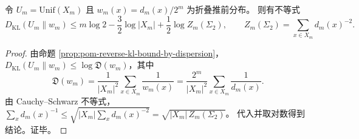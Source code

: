 \begin{corollary}[属二配分函数控制的反向 KL 上界]\label{cor:fold-reversekl-controlled-by-genus2-partition}
令 \(U_m=\mathrm{Unif}(X_m)\) 且 \(w_m(x)=d_m(x)/2^m\) 为折叠推前分布。
则有不等式
\[
D_{\mathrm{KL}}(U_m\|w_m)
\le
m\log 2-\frac{3}{2}\log|X_m|+\frac{1}{2}\log Z_m(\Sigma_2),
\qquad
Z_m(\Sigma_2)=\sum_{x\in X_m}d_m(x)^{-2}.
\]
\end{corollary}
\begin{proof}
由命题 \ref{prop:pom-reverse-kl-bound-by-dispersion}，
\(
D_{\mathrm{KL}}(U_m\|w_m)\le \log\mathfrak{D}(w_m)
\)，其中
\[
\mathfrak{D}(w_m)=\frac{1}{|X_m|^2}\sum_{x\in X_m}\frac{1}{w_m(x)}
=\frac{2^m}{|X_m|^2}\sum_{x\in X_m}\frac{1}{d_m(x)}.
\]
由 Cauchy--Schwarz 不等式，
\(
\sum_x d_m(x)^{-1}\le \sqrt{|X_m|\sum_x d_m(x)^{-2}}=\sqrt{|X_m|\,Z_m(\Sigma_2)}
\)。
代入并取对数得到结论。证毕。
\end{proof}

\endinput

